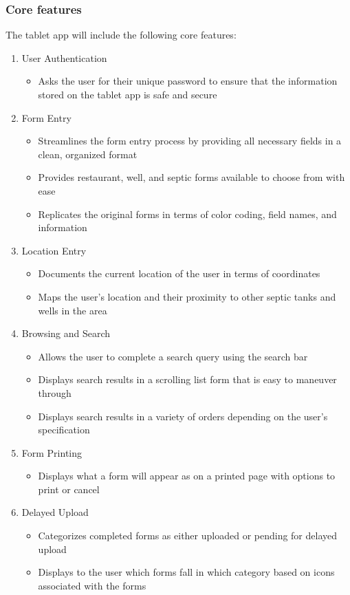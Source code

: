 \documentclass[twoside,letterpaper]{article}
\begin{document}
\subsubsection{Core features}
{\rmfamily\color{black}
The tablet app will include the following core features:
\begin{enumerate}
\item User Authentication
\begin{itemize}
\item Asks the user for their unique password to ensure that the information stored on the tablet app is safe and secure
\end{itemize}
\item Form Entry
\begin{itemize}
\item Streamlines the form entry process by providing all necessary fields in a clean, organized format
\item Provides restaurant, well, and septic forms available to choose from with ease
\item Replicates the original forms in terms of color coding, field names, and information
\end{itemize}
\item Location Entry
\begin{itemize}
\item Documents the current location of the user in terms of coordinates
\item Maps the user's location and their proximity to other septic tanks and wells in the area
\end{itemize}
\item Browsing and Search
\begin{itemize}
\item Allows the user to complete a search query using the search bar
\item Displays search results in a scrolling list form that is easy to maneuver through
\item Displays search results in a variety of orders depending on the user's specification
\end{itemize}
\item Form Printing
\begin{itemize}
\item Displays what a form will appear as on a printed page with options to print or cancel
\end{itemize}
\item Delayed Upload
\begin{itemize}
\item Categorizes completed forms as either uploaded or pending for delayed upload
\item Displays to the user which forms fall in which category based on icons associated with the forms
\end{itemize}
\end{enumerate}
}
\end{document}
